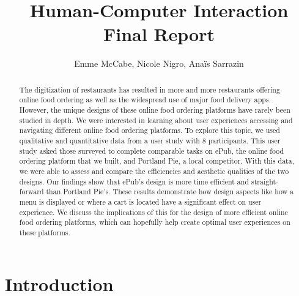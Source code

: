\documentclass[runningheads]{llncs}
\begin{document}
\title{Human-Computer Interaction Final Report}
\author{Emme McCabe, Nicole Nigro, Anaïs Sarrazin}

\maketitle             

\begin{abstract}

The digitization of restaurants has resulted in more and more restaurants offering online food ordering as well as the widespread use of major food delivery apps. However, the unique designs of these online food ordering platforms have rarely been studied in depth. We were interested in learning about user experiences accessing and navigating different online food ordering platforms. To explore this topic, we used qualitative and quantitative data from a user study with 8 participants. This user study asked those surveyed to complete comparable tasks on ePub, the online food ordering platform that we built, and Portland Pie, a local competitor. With this data, we were able to assess and compare the efficiencies and aesthetic qualities of the two designs. Our findings show that ePub’s design is more time efficient and straight-forward than Portland Pie’s. These results demonstrate how design aspects like how a menu is displayed or where a cart is located have a significant effect on user experience. We discuss the implications of this for the design of more efficient online food ordering platforms, which can hopefully help create optimal user experiences on these platforms.

\end{abstract}

\section{Introduction}
\end{document}
